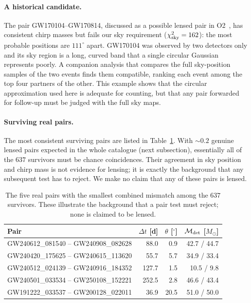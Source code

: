 \documentclass[aps,prd,twocolumn,superscriptaddress,nofootinbib,floatfix]{revtex4-2}
\newcommand{\msun}{M_\odot}
\begin{document}
\paragraph*{A historical candidate.}
The pair GW170104--GW170814, discussed as a possible lensed pair in O2~\cite{Dai2020}, has consistent chirp masses but fails our sky requirement ($\chi^2_{\rm sky}=162$): the most probable positions are $111^\circ$ apart.
GW170104 was observed by two detectors only and its sky region is a long, curved band that a single circular Gaussian represents poorly.
A companion analysis that compares the full sky-position samples of the two events finds them compatible, ranking each event among the top four partners of the other.
This example shows that the circular approximation used here is adequate for counting, but that any pair forwarded for follow-up must be judged with the full sky maps.

\paragraph*{Surviving real pairs.}
The most consistent surviving pairs are listed in Table~\ref{tab:survivors}.
With ${\sim}0.2$ genuine lensed pairs expected in the whole catalogue (next subsection), essentially all of the $637$ survivors must be chance coincidences.
Their agreement in sky position and chirp mass is not evidence for lensing; it is exactly the background that any subsequent test has to reject.
We make no claim that any of these pairs is lensed.

\begin{table}[t]
\caption{The five real pairs with the smallest combined mismatch among the $637$ survivors.
These illustrate the background that a pair test must reject; none is claimed to be lensed.}
\label{tab:survivors}
\footnotesize
\begin{ruledtabular}
\begin{tabular}{lrrr}
Pair & $\Delta t$ [d] & $\theta$ [$^\circ$] & $\mathcal M_{\rm det}$ [$\msun$] \\
\hline
GW240612\_081540 -- GW240908\_082628 & 88.0 & 0.9 & 42.7 / 44.7 \\
GW240420\_175625 -- GW240615\_113620 & 55.7 & 5.7 & 34.9 / 33.4 \\
GW240512\_024139 -- GW240916\_184352 & 127.7 & 1.5 & 10.5 / 9.8 \\
GW240501\_033534 -- GW250108\_152221 & 252.5 & 2.8 & 46.6 / 43.4 \\
GW191222\_033537 -- GW200128\_022011 & 36.9 & 20.5 & 51.0 / 50.0 \\
\end{tabular}
\end{ruledtabular}
\end{table}
\end{document}
